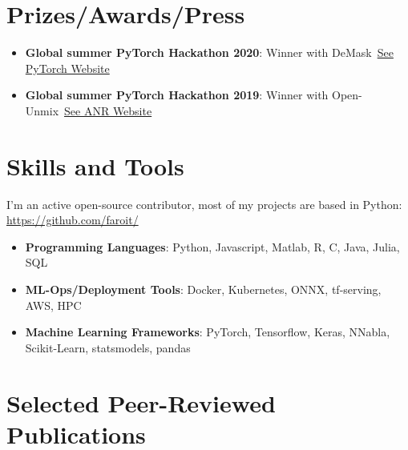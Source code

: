 \documentclass[a4paper,11pt]{article}
\newcommand{\resumeItem}[2]{
  \item\small{
    \textbf{#1}{: #2 \vspace{-2pt}}
  }
}
\newcommand{\resumeSubItem}[2]{\resumeItem{#1}{#2}\vspace{-4pt}}
\newcommand{\resumeSubHeadingListStart}{\begin{itemize}[leftmargin=*]}
\newcommand{\resumeSubHeadingListEnd}{\end{itemize}}
\begin{document}
\section{Prizes/Awards/Press}
\resumeSubHeadingListStart
    \resumeSubItem{Global summer PyTorch Hackathon 2020}
        {Winner with DeMask~\href{https://pytorch.org/blog/announcing-the-winners-of-the-2020-global-pytorch-summer-hackathon/}{See PyTorch Website}}
    \resumeSubItem{Global summer PyTorch Hackathon 2019}
        {Winner with Open-Unmix~\href{https://anr.fr/fr/actualites-de-lanr/details/news/open-unmix-un-logiciel-open-source-issu-du-projet-anr-kamoulox-pour-demixer-la-musique/}{See ANR Website}}
\resumeSubHeadingListEnd

\section{Skills and Tools}
I'm an active open-source contributor, most of my projects are based in Python: \url{https://github.com/faroit/}
 \resumeSubHeadingListStart
   \resumeSubItem{Programming Languages}
     {Python, Javascript, Matlab, R, C, Java, Julia, SQL}
   \resumeSubItem{ML-Ops/Deployment Tools}
     {Docker, Kubernetes, ONNX, tf-serving, AWS, HPC}
   \resumeSubItem{Machine Learning Frameworks}
     {PyTorch, Tensorflow, Keras, NNabla, Scikit-Learn, statsmodels, pandas}
     \resumeSubHeadingListEnd
     
\section{Selected Peer-Reviewed Publications}
\end{document}
